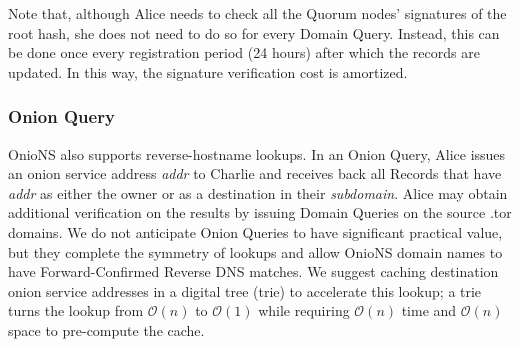 \documentclass[USenglish,oneside,twocolumn]{article}
\begin{document}
Note that, although Alice needs to check all the Quorum nodes' signatures of the root hash, she does not need to do so for every Domain Query. Instead, this can be done once every registration period (24 hours) after which the records are updated. In this way, the signature verification cost is amortized.


\subsubsection{Onion Query}

OnioNS also supports reverse-hostname lookups. In an Onion Query, Alice issues an onion service address \emph{addr} to Charlie and receives back all Records that have \emph{addr} as either the owner or as a destination in their \emph{subdomain}. Alice may obtain additional verification on the results by issuing Domain Queries on the source .tor domains. We do not anticipate Onion Queries to have significant practical value, but they complete the symmetry of lookups and allow OnioNS domain names to have Forward-Confirmed Reverse DNS matches. We suggest caching destination onion service addresses in a digital tree (trie) to accelerate this lookup; a trie turns the lookup from $ \mathcal{O}(n) $ to $ \mathcal{O}(1) $ while requiring $ \mathcal{O}(n) $ time and $ \mathcal{O}(n) $ space to pre-compute the cache.


\end{document}
